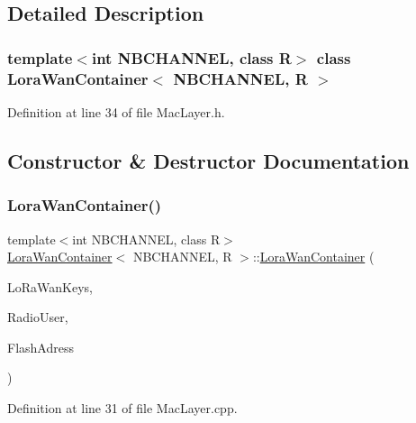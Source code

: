 \subsection{Detailed Description}
\subsubsection*{template$<$int N\+B\+C\+H\+A\+N\+N\+EL, class R$>$\newline
class Lora\+Wan\+Container$<$ N\+B\+C\+H\+A\+N\+N\+E\+L, R $>$}



Definition at line 34 of file Mac\+Layer.\+h.



\subsection{Constructor \& Destructor Documentation}
\mbox{\label{class_lora_wan_container_a44404ff31803a6c55ffc152c023a7db8}} 
\subsubsection{\texorpdfstring{Lora\+Wan\+Container()}{LoraWanContainer()}}
{\footnotesize\ttfamily template$<$int N\+B\+C\+H\+A\+N\+N\+EL, class R$>$ \\
\mbox{\hyperlink{class_lora_wan_container}{Lora\+Wan\+Container}}$<$ N\+B\+C\+H\+A\+N\+N\+EL, R $>$\+::\mbox{\hyperlink{class_lora_wan_container}{Lora\+Wan\+Container}} (\begin{DoxyParamCaption}\item[{\mbox{\hyperlink{structs_lo_ra_wan_keys}{s\+Lo\+Ra\+Wan\+Keys}}}]{Lo\+Ra\+Wan\+Keys,  }\item[{R $\ast$}]{Radio\+User,  }\item[{uint32\+\_\+t}]{Flash\+Adress }\end{DoxyParamCaption})}



Definition at line 31 of file Mac\+Layer.\+cpp.

\mbox{\label{class_lora_wan_container_ae1add5f5a0620c3d513737e2e7241575}} 
